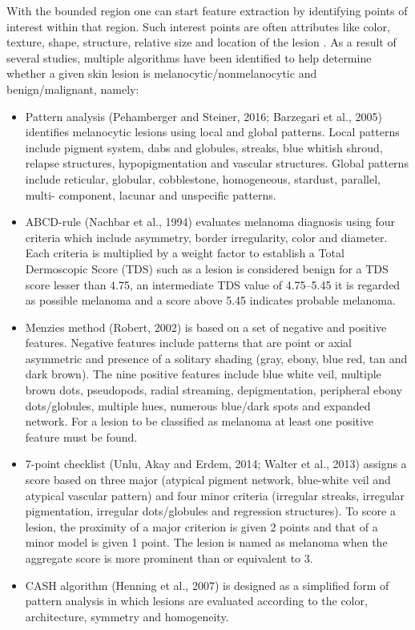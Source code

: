     With the bounded region one can start feature extraction by identifying points of interest within that region. Such interest points are often attributes like color, texture, shape, structure, relative size and location of the lesion \cite{Barata2014}. As a result of several studies, multiple algorithms have been identified to help determine whether a given skin lesion is melanocytic/nonmelanocytic and benign/malignant, namely: 
    \begin{itemize}
        \item Pattern analysis (Pehamberger and Steiner, 2016; Barzegari et al., 2005) identifies melanocytic lesions using local and global patterns. Local patterns include pigment system, dabs and globules, streaks, blue whitish shroud, relapse structures, hypopigmentation and vascular structures. Global patterns include reticular, globular, cobblestone, homogeneous, stardust, parallel, multi- component, lacunar and unspecific patterns.
        \item ABCD-rule (Nachbar et al., 1994) evaluates melanoma diagnosis using four criteria which include asymmetry, border irregularity, color and diameter. Each criteria is multiplied by a weight factor to establish a Total Dermoscopic Score (TDS) such as a lesion is considered benign for a TDS score lesser than 4.75, an intermediate TDS value of 4.75–5.45 it is regarded as possible melanoma and a score above 5.45 indicates probable melanoma.
        \item Menzies method (Robert, 2002) is based on a set of negative and positive features. Negative features include patterns that are point or axial asymmetric and presence of a solitary shading (gray, ebony, blue red, tan and dark brown). The nine positive features include blue white veil, multiple brown dots, pseudopods, radial streaming, depigmentation, peripheral ebony dots/globules, multiple hues, numerous blue/dark spots and expanded network. For a lesion to be classified as melanoma at least one positive feature must be found.
        \item 7-point checklist (Unlu, Akay and Erdem, 2014; Walter et al., 2013) assigns a score based on three major (atypical pigment network, blue-white veil and atypical vascular pattern) and four minor criteria (irregular streaks, irregular pigmentation, irregular dots/globules and regression structures). To score a lesion, the proximity of a major criterion is given 2 points and that of a minor model is given 1 point. The lesion is named as melanoma when the aggregate score is more prominent than or equivalent to 3.
        \item CASH algorithm (Henning et al., 2007) is designed as a simplified form of pattern analysis in which lesions are evaluated according to the color, architecture, symmetry and homogeneity.
    \end{itemize}
    
